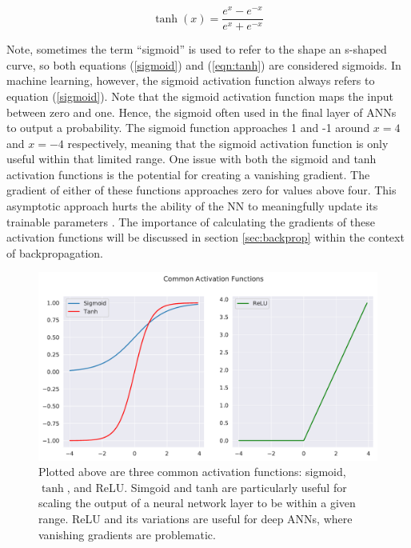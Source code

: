 \begin{equation}
    \label{eqn:tanh}
    \tanh(x) = \frac{e^x - e^{-x}}{e^x + e^{-x}} 
\end{equation}

\noindent Note, sometimes the term ``sigmoid'' is used to refer to the shape an s-shaped curve, so both equations (\ref{sigmoid}) and (\ref{eqn:tanh}) are considered sigmoids. In machine learning, however, the sigmoid activation function always refers to equation (\ref{sigmoid}). Note that the sigmoid activation function maps the input between zero and one. Hence, the sigmoid often used in the final layer of ANNs to output a probability. The sigmoid function approaches 1 and -1 around $ {x=4} $ and $ {x=-4} $ respectively, meaning that the sigmoid activation function is only useful within that limited range. One issue with both the sigmoid and tanh activation functions is the potential for creating a vanishing gradient. The gradient of either of these functions approaches zero for values above four. This asymptotic approach hurts the ability of the NN to meaningfully update its trainable parameters  \cite{nn-regularization}. The importance of calculating the gradients of these activation functions will be discussed in section \ref{sec:backprop} within the context of backpropagation. 

\begin{figure}[h!]
    \centering
    \includegraphics[width=\linewidth]{Chapters/Figures/sigmoids2.pdf}
    \caption[Activation-Functions]{Plotted above are three common activation functions: sigmoid, $\tanh$, and ReLU. Simgoid and tanh are particularly useful for scaling the output of a neural network layer to be within a given range. ReLU and its variations are useful for deep ANNs, where vanishing gradients are problematic.}
    \label{fig:ActivationFunctions}
\end{figure}

